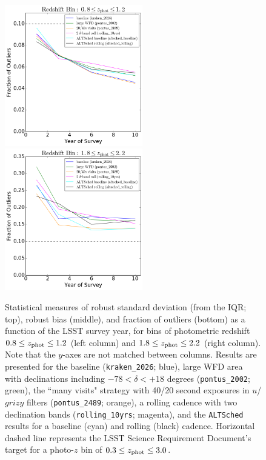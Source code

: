 \begin{figure}
\begin{center}
\includegraphics[width=6cm,trim={0cm 0cm 0cm 0cm},clip]{figures/zbin1_fout.png}
\includegraphics[width=6cm,trim={0cm 0cm 0cm 0cm},clip]{figures/zbin2_fout.png}
\caption{\small{Statistical measures of robust standard deviation (from the IQR; top), robust bias (middle), and fraction of outliers (bottom) as a function of the LSST survey year, for bins of photometric redshift $0.8 \leq z_{\rm phot} \leq 1.2$ (left column) and  $1.8 \leq z_{\rm phot} \leq 2.2$ (right column). Note that the $y$-axes are not matched between columns. Results are presented for the baseline ({\tt kraken\_2026}; blue), large WFD area with declinations including  $-78<\delta<+18$ degrees ({\tt pontus\_2002}; green), the ``many visits" strategy with 40/20 second exposures in $u$/$grizy$ filters ({\tt pontus\_2489}; orange), a rolling cadence with two declination bands ({\tt rolling\_10yrs}; magenta), and the {\tt ALTSched} results for a baseline (cyan) and rolling (black) cadence. Horizontal dashed line represents the LSST Science Requirement Document's target for a photo-$z$ bin of $0.3 \leq z_{\rm phot} \leq 3.0$.} \label{fig:evol}}
\end{center}
\end{figure}

